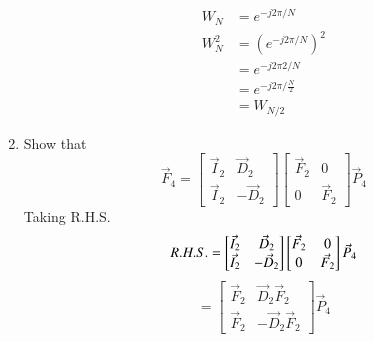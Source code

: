 \documentclass[journal,12pt,twocolumn]{IEEEtran}
\renewcommand\thesection{\arabic{section}}
\begin{document}
\begin{enumerate}[label=\arabic*.,ref=\thesection.\theenumi]
\begin{align}
                W_{N}     & = e^{-j2\pi/N}           \\
                W_{N}^{2} & = (e^{-j2\pi/N})^2       \\
                          & = e^{-j2\pi2/N}          \\
                          & = e^{-j2\pi/\frac{N}{2}} \\
                          & = W_{N/2}
           \end{align}
     \item Show that
           \begin{equation}
                \vec{F}_{4}=
                \begin{bmatrix}
                     \vec{I}_{2} & \vec{D}_{2}  \\
                     \vec{I}_{2} & -\vec{D}_{2}
                \end{bmatrix}
                \begin{bmatrix}
                     \vec{F}_{2} & 0           \\
                     0           & \vec{F}_{2}
                \end{bmatrix}
                \vec{P}_{4}
           \end{equation}
           \solution Taking R.H.S.
           \begin{equation}
                R.H.S. =
                \begin{bmatrix}
                     \vec{I}_{2} & \vec{D}_{2}  \\
                     \vec{I}_{2} & -\vec{D}_{2}
                \end{bmatrix}
                \begin{bmatrix}
                     \vec{F}_{2} & 0           \\
                     0           & \vec{F}_{2}
                \end{bmatrix} \\
                \vec{P}_{4}
           \end{equation}
           \begin{equation}
                =
                \begin{bmatrix}
                     \vec{F}_{2} & \vec{D}_{2}\vec{F}_{2}  \\
                     \vec{F}_{2} & -\vec{D}_{2}\vec{F}_{2}
                \end{bmatrix}
                \vec{P}_{4}
           \end{equation}

\end{enumerate}
\end{document}
